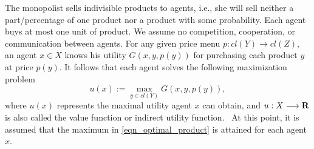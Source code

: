 The monopolist sells indivisible products to agents, i.e., she will sell neither a part/percentage of one product nor a product with some probability. Each agent buys at most one unit of product. We assume no competition, cooperation, or communication between agents. For any given price menu $p: cl(Y) \rightarrow cl(Z)$, an agent $x \in X$ knows his utility $G(x,y,p(y))$ for purchasing each product $y$ at price $p(y)$. It follows that each agent solves the following maximization problem 
\begin{equation}\label{eqn_optimal_product}
	u(x):=\max_{y \in cl(Y)} G(x, y, p(y)),
\end{equation}
where $u(x)$ represents the maximal utility agent $x$ can obtain, and $u: X \longrightarrow {\mathbf R}$ is also called the value function or indirect utility function.%
~At this point, it is assumed that the maximum in \eqref{eqn_optimal_product} is attained for each agent $x$. \medskip

